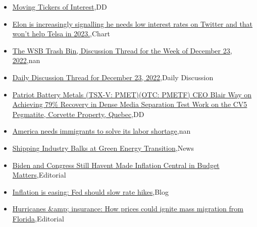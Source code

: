 \documentclass{article}%
\begin{document}
%
\begin{itemize}%
\item%
\href{https://reddit.com/r/wallstreetbets/comments/zte2k2/moving\_tickers\_of\_interest/}{Moving Tickers of Interest},DD%
\item%
\href{https://reddit.com/r/wallstreetbets/comments/ztdske/elon\_is\_increasingly\_signalling\_he\_needs\_low/}{Elon is increasingly signalling he needs low interest rates on Twitter and that won't help Telsa in 2023.},Chart%
\item%
\href{https://reddit.com/r/wallstreetbets/comments/ztclzk/the\_wsb\_trash\_bin\_discussion\_thread\_for\_the\_week/}{The WSB Trash Bin, Discussion Thread for the Week of December 23, 2022},nan%
\item%
\href{https://reddit.com/r/wallstreetbets/comments/ztcly9/daily\_discussion\_thread\_for\_december\_23\_2022/}{Daily Discussion Thread for December 23, 2022},Daily Discussion%
\item%
\href{https://reddit.com/r/Baystreetbets/comments/zsn2qu/patriot\_battery\_metals\_tsxv\_pmetotc\_pmetf\_ceo/}{Patriot Battery Metals (TSX-V: PMET)(OTC: PMETF) CEO Blair Way on Achieving 79\% Recovery in Dense Media Separation Test Work on the CV5 Pegmatite, Corvette Property, Quebec},DD%
\item%
\href{https://reddit.com/r/Economics/comments/ztbw5c/america\_needs\_immigrants\_to\_solve\_its\_labor/}{America needs immigrants to solve its labor shortage},nan%
\item%
\href{https://reddit.com/r/Economics/comments/zsz7qm/shipping\_industry\_balks\_at\_green\_energy\_transition/}{Shipping Industry Balks at Green Energy Transition},News%
\item%
\href{https://reddit.com/r/Economics/comments/zsyw0u/biden\_and\_congress\_still\_havent\_made\_inflation/}{Biden and Congress Still Havent Made Inflation Central in Budget Matters},Editorial%
\item%
\href{https://reddit.com/r/Economics/comments/zsyilg/inflation\_is\_easing\_fed\_should\_slow\_rate\_hikes/}{Inflation is easing: Fed should slow rate hikes},Blog%
\item%
\href{https://reddit.com/r/Economics/comments/zsya1m/hurricanes\_insurance\_how\_prices\_could\_ignite\_mass/}{Hurricanes \&amp; insurance: How prices could ignite mass migration from Florida},Editorial%
\end{itemize}%
\end{document}
